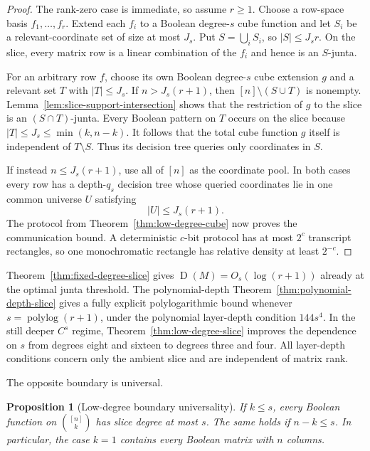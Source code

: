 \documentclass[11pt]{article}
\newtheorem{proposition}[theorem]{Proposition}
\theoremstyle{definition}
\theoremstyle{remark}
\newcommand{\1}{\mathbf 1}
\newcommand{\Dcc}{\operatorname{D}}
\begin{document}
\begin{proof}
The rank-zero case is immediate, so assume $r\ge1$.  Choose a row-space
basis $f_1,\ldots,f_r$.  Extend each $f_i$ to a Boolean degree-$s$ cube
function and let $S_i$ be a relevant-coordinate set of size at most $J_s$.
Put $S=\bigcup_iS_i$, so $|S|\le J_sr$.  On the slice, every matrix row is a
linear combination of the $f_i$ and hence is an $S$-junta.

For an arbitrary row $f$, choose its own Boolean degree-$s$ cube extension
$g$ and a relevant set $T$ with $|T|\le J_s$.  If
$n>J_s(r+1)$, then $[n]\setminus(S\cup T)$ is nonempty.
Lemma~\ref{lem:slice-support-intersection} shows that the restriction of $g$
to the slice is an $(S\cap T)$-junta.  Every Boolean pattern on $T$ occurs on
the slice because $|T|\le J_s\le\min(k,n-k)$.  It follows that the total cube
function $g$ itself is independent of $T\setminus S$.  Thus its decision tree
queries only coordinates in $S$.

If instead $n\le J_s(r+1)$, use all of $[n]$ as the coordinate pool.  In both
cases every row has a depth-$q_s$ decision tree whose queried coordinates lie
in one common universe $U$ satisfying
\[
 |U|\le J_s(r+1).
\]
The protocol from Theorem~\ref{thm:low-degree-cube} now proves the
communication bound.  A deterministic $c$-bit protocol has at most $2^c$
transcript rectangles, so one monochromatic rectangle has relative density
at least $2^{-c}$.
\end{proof}

Theorem~\ref{thm:fixed-degree-slice} gives
$\Dcc(M)=O_s(\log(r+1))$ already at the optimal junta threshold.  The
polynomial-depth Theorem~\ref{thm:polynomial-depth-slice} gives a fully
explicit polylogarithmic bound whenever $s=\operatorname{polylog}(r+1)$,
under the polynomial layer-depth condition $144s^4$.  In the still deeper
$C^s$ regime, Theorem~\ref{thm:low-degree-slice} improves the dependence on
$s$ from degrees eight and sixteen to degrees three and four.  All layer-depth
conditions concern only the ambient slice and are independent of matrix rank.

The opposite boundary is universal.

\begin{proposition}[Low-degree boundary universality]
\label{prop:low-degree-boundary}
If $k\le s$, every Boolean function on $\binom{[n]}k$ has slice degree at
most $s$.  The same holds if $n-k\le s$.  In particular, the case $k=1$
contains every Boolean matrix with $n$ columns.
\end{proposition}
\end{document}
